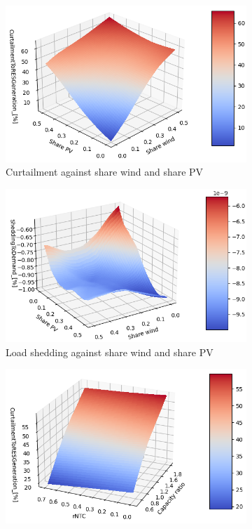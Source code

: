 \begin{figure}[h]
\begin{subfigure}[b]{0.49\textwidth}
        \includegraphics[width=\textwidth]{resources/images/view_3-4-0.png}
        \caption{Curtailment against share wind and share PV}
        \label{fig:surf-3-4-0}
    \end{subfigure}
    \hfill
    \begin{subfigure}[b]{0.49\textwidth}
        \includegraphics[width=\textwidth]{resources/images/view_3-4-1.png}
        \caption{Load shedding against share wind and share PV}
        \label{fig:surf-3-4-1}
    \end{subfigure}
    \hfill
    \begin{subfigure}[b]{0.49\textwidth}
        \includegraphics[width=\textwidth]{resources/images/view_0-5-0.png}

\end{subfigure}
\end{figure}

